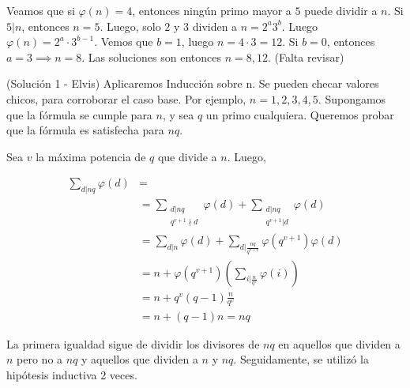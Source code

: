 \begin{sol}
	Veamos que si $\varphi(n) = 4$, entonces ning\'un primo mayor a $5$ puede dividir a $n$. Si $5|n$, entonces $n=5$. Luego, solo $2$ y $3$ dividen a $n= 2^{a} 3^{b}$. Luego $\varphi(n) = 2^{a}\cdot 3^{b-1}$. Vemos que $b = 1$, luego $n = 4\cdot 3 = 12$. Si $b = 0$, entonces $a=3 \implies n = 8$. Las soluciones son entonces $n = 8, 12$. (Falta revisar)
\end{sol}

\begin{sol}
	
	(Solución 1 - Elvis)
	Aplicaremos Inducci\'on sobre n. Se pueden checar valores chicos, para corroborar el caso base. Por ejemplo, $n = 1, 2, 3, 4, 5$. Supongamos que la f\'ormula se cumple para $n$, y sea $q$ un primo cualquiera. Queremos probar que la f\'ormula es satisfecha para $nq$.

	Sea $v$ la m\'axima potencia de $q$ que divide a $n$. Luego,
	
	\begin{align*}
		\sum_{d|nq} \varphi(d) &=  \\
		 &=	\sum_{\substack{d|nq \\ q^{v+1}\nmid d}}\varphi(d) 
		     +\sum_{\substack{d|nq \\ q^{v+1}| d}} \varphi(d) \\
		 &= \sum_{d|n }\varphi(d)  + \sum_{d|\frac{nq}{q^{v+1}}} \varphi(q^{v+1})\varphi(d) \\
		 &= n + \varphi(q^{v+1}) \left(\sum_{i|\frac{n}{q^{v}}} \varphi(i) \right) \\
		 & = n + q^{v}(q-1)\frac{n}{q^{v}} \\
		 &= n + (q-1)n = nq	
	\end{align*}

	La primera igualdad sigue de dividir los divisores de $nq$ en aquellos que dividen a $n$ pero no a $nq$ y aquellos que dividen a $n$ y $nq$. Seguidamente, se utilizó la hipótesis inductiva 2 veces.
\end{sol}

